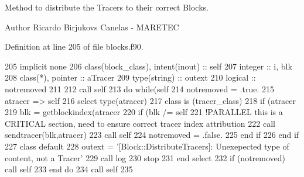 Method to distribute the Tracers to their correct Blocks. 

\begin{DoxyAuthor}{Author}
Ricardo Birjukovs Canelas -\/ M\+A\+R\+E\+T\+EC 
\end{DoxyAuthor}


Definition at line 205 of file blocks.\+f90.


\begin{DoxyCode}
205     \textcolor{keywordtype}{implicit none}
206     \textcolor{keywordtype}{class}(block\_class), \textcolor{keywordtype}{intent(inout)} :: self
207     \textcolor{keywordtype}{integer} :: i, blk
208     \textcolor{keywordtype}{class}(*), \textcolor{keywordtype}{pointer} :: aTracer
209     \textcolor{keywordtype}{type}(string) :: outext
210     \textcolor{keywordtype}{logical} :: notremoved
211     
212     \textcolor{keyword}{call }self%
213     \textcolor{keywordflow}{do} \textcolor{keywordflow}{while}(self%
214         notremoved = .true.
215         atracer => self%
216         \textcolor{keywordflow}{select type}(atracer)
217 \textcolor{keywordflow}{        class is} (tracer\_class)
218             \textcolor{keywordflow}{if} (atracer%
219                 blk = getblockindex(atracer%
220                 \textcolor{keywordflow}{if} (blk /= self%
221                     \textcolor{comment}{!PARALLEL this is a CRITICAL section, need to ensure correct tracer index attribution}
222                     \textcolor{keyword}{call }sendtracer(blk,atracer)
223                     \textcolor{keyword}{call }self%
224                     notremoved = .false.
225 \textcolor{keywordflow}{                end if}
226 \textcolor{keywordflow}{            end if}
227 \textcolor{keywordflow}{            class default}
228             outext = \textcolor{stringliteral}{'[Block::DistributeTracers]: Unexepected type of content, not a Tracer'}
229             \textcolor{keyword}{call }log%
230             stop
231 \textcolor{keywordflow}{        end select}
232         \textcolor{keywordflow}{if} (notremoved) \textcolor{keyword}{call }self%
233 \textcolor{keywordflow}{    end do}
234     \textcolor{keyword}{call }self%
235     
\end{DoxyCode}
